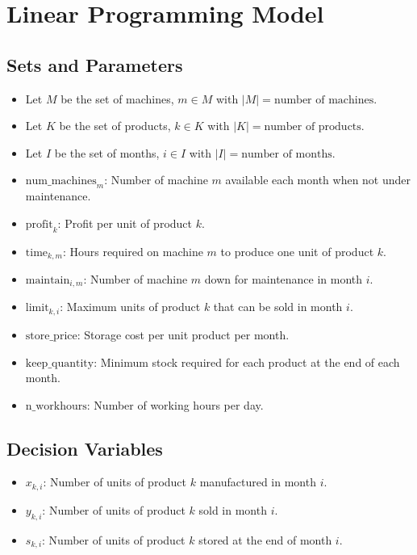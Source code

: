 \documentclass{article}
\begin{document}
\section*{Linear Programming Model}

\subsection*{Sets and Parameters}

\begin{itemize}
    \item Let $M$ be the set of machines, $m \in M$ with $|M| = \text{number of machines}$.
    \item Let $K$ be the set of products, $k \in K$ with $|K| = \text{number of products}$.
    \item Let $I$ be the set of months, $i \in I$ with $|I| = \text{number of months}$.
    \item $\text{num\_machines}_m$: Number of machine $m$ available each month when not under maintenance.
    \item $\text{profit}_k$: Profit per unit of product $k$.
    \item $\text{time}_{k,m}$: Hours required on machine $m$ to produce one unit of product $k$.
    \item $\text{maintain}_{i,m}$: Number of machine $m$ down for maintenance in month $i$.
    \item $\text{limit}_{k,i}$: Maximum units of product $k$ that can be sold in month $i$.
    \item $\text{store\_price}$: Storage cost per unit product per month.
    \item $\text{keep\_quantity}$: Minimum stock required for each product at the end of each month.
    \item $\text{n\_workhours}$: Number of working hours per day.
\end{itemize}

\subsection*{Decision Variables}

\begin{itemize}
    \item $x_{k,i}$: Number of units of product $k$ manufactured in month $i$.
    \item $y_{k,i}$: Number of units of product $k$ sold in month $i$.
    \item $s_{k,i}$: Number of units of product $k$ stored at the end of month $i$.
\end{itemize}
\end{document}
